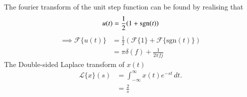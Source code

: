 \documentclass[journal,12pt,twocolumn]{IEEEtran}
\begin{document}
The fourier transform of the unit step function can be found by realising that
\begin{align}
u(t)=\frac12(1+\mathop{\mathrm{sgn}}(t))    
\end{align}
\begin{align}
 \implies   \mathcal{F}\{u(t)\}&=\frac12\left(\mathcal{F}\{1\}+\mathcal{F}\{\text{sgn}(t)\}\right)\\&=\pi\delta(f)+\frac{1}{2\pi fj}
\end{align}
The Double-sided Laplace transform of $x(t)$
\begin{align}
    \mathcal{L}\{x\}(s) &= \int_{-\infty}^{\infty} x(t)e^{-st} \, dt.\\
    &=\frac{2}{s}
\end{align}
\end{document}
